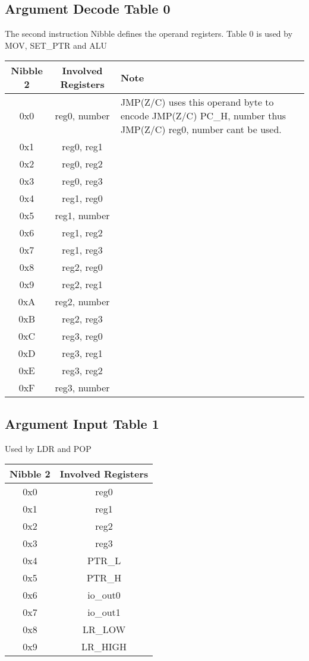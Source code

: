 \documentclass[a4paper, 12pt]{article}
\begin{document}
	\subsection{Argument Decode Table 0}
	The second instruction Nibble defines the operand registers.
	Table 0 is used by MOV, SET\_PTR and ALU
	\begin{center}
		\begin{tabular}{|c|c|p{6cm}|}
			\hline
			Nibble 2 & Involved Registers & Note \\ \hline
			0x0 & reg0, number & JMP(Z/C) uses this operand byte to encode JMP(Z/C) PC\_H, number thus JMP(Z/C) reg0, number cant be used. \\ \hline
			0x1 & reg0, reg1 & \\ \hline
			0x2 & reg0, reg2 & \\ \hline
			0x3 & reg0, reg3 & \\ \hline
			0x4 & reg1, reg0 & \\ \hline
			0x5 & reg1, number & \\ \hline
			0x6 & reg1, reg2 & \\ \hline
			0x7 & reg1, reg3 & \\ \hline
			0x8 & reg2, reg0 & \\ \hline
			0x9 & reg2, reg1 & \\ \hline
			0xA & reg2, number & \\ \hline
			0xB & reg2, reg3 & \\ \hline
			0xC & reg3, reg0 & \\ \hline
			0xD & reg3, reg1 & \\ \hline
			0xE & reg3, reg2 & \\ \hline
			0xF & reg3, number & \\ \hline
		\end{tabular}
	\end{center}	
	\newpage
	\subsection{Argument Input Table 1}
	Used by LDR and POP
	\begin{center}
		\begin{tabular}{|c|c|}
			\hline
			Nibble 2 & Involved Registers \\ \hline
			0x0 & reg0 \\ \hline
			0x1 & reg1 \\ \hline
			0x2 & reg2 \\ \hline
			0x3 & reg3 \\ \hline
			0x4 & PTR\_L\\ \hline
			0x5 & PTR\_H \\ \hline
			0x6 & io\_out0 \\ \hline
			0x7 & io\_out1 \\ \hline
			0x8 & LR\_LOW \\ \hline
			0x9 & LR\_HIGH \\ \hline
		\end{tabular}
	\end{center}	
\end{document}
